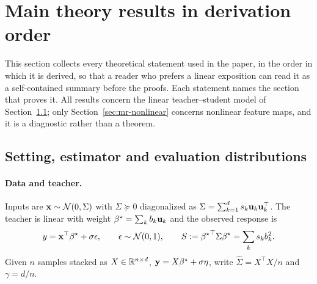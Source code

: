 %
%
\section{Main theory results in derivation order}
\label{sec:app-main-results}

This section collects every theoretical statement used in the paper, in the
order in which it is derived, so that a reader who prefers a linear
exposition can read it as a self-contained summary before the proofs.  Each
statement names the section that proves it.  All results concern the linear
teacher--student model of Section~\ref{sec:mr-setting}; only
Section~\ref{sec:mr-nonlinear} concerns nonlinear feature maps, and it is a
diagnostic rather than a theorem.

\subsection{Setting, estimator and evaluation distributions}
\label{sec:mr-setting}

\paragraph{Data and teacher.}
Inputs are $\mathbf{x}\sim\mathcal N(0,\Sigma)$ with $\Sigma\succeq0$ diagonalized as
$\Sigma=\sum_{k=1}^{d}s_k{\mathbf{u}}_k{\mathbf{u}}_k^\top$.  The teacher is linear with
weight ${\beta^{\star}}=\sum_k b_k{\mathbf{u}}_k$ and the observed response is
\begin{equation}
y=\mathbf{x}^\top{\beta^{\star}}+\sigma\epsilon,\qquad \epsilon\sim\mathcal N(0,1),
\qquad S:={{\beta^{\star}}}^\top\Sigma{\beta^{\star}}=\sum_k s_kb_k^2 .
\label{eq:mr-teacher}
\end{equation}
Given $n$ samples stacked as $X\in\mathbb{R}^{n\times d}$, $\mathbf y=X{\beta^{\star}}+\sigma\eta$,
write $\hat\Sigma=X^\top X/n$ and $\gamma=d/n$.

